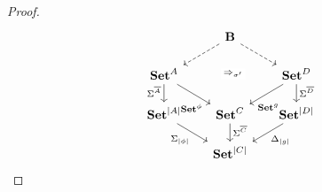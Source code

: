 \documentclass[11pt, oneside, article]{memoir}
\theoremstyle{plain}
\theoremstyle{definition}
\theoremstyle{remark}
\DeclarePairedDelimiter{\abs}{\lvert}{\rvert}
\newcommand{\namedcat}[1]{\mathbf{#1}}
\newcommand{\cat}[1]{\mathbf{#1}}
\newcommand{\Set}{\namedcat{Set}}
\newcommand{\CoalgOn}[2]{{#2}^{#1}}
\newcommand{\CoalgSet}[1]{\CoalgOn{#1}{\Set}}
\newcommand{\clift}[1]{\overline{#1}}
\newcommand{\pts}[1]{{\abs{#1}}}
\newcommand{\one}[1]{\pts{#1}}
\newcommand{\carr}{\Sigma}
\newcommand{\leindex}[1]{\Sigma_{#1}}
\newcommand{\reindex}[1]{\Delta_{#1}}
\newcommand{\car}[1]{\carr^{#1}}
\newcommand{\com}[2]{{#1}^{#2}}
\newcommand{\con}[2]{{#1}^{#2}}
\newcommand{\cmnd}[1]{{#1}}
\newcommand{\cA}{\cmnd{A}}
\newcommand{\cB}{\cmnd{B}}
\newcommand{\cC}{\cmnd{C}}
\newcommand{\cD}{\cmnd{D}}
\newcommand{\bB}{\cat{B}}
\newcommand{\ASet}{\CoalgSet{\cA}}
\newcommand{\BSet}{\CoalgSet{\cB}}
\newcommand{\CSet}{\CoalgSet{\cC}}
\newcommand{\DSet}{\CoalgSet{\cD}}
\newcommand{\SetpA}{\Set^\pts{\cA}}
\newcommand{\SetpB}{\Set^\pts{\cB}}
\newcommand{\SetpC}{\Set^\pts{\cC}}
\newcommand{\SetpD}{\Set^\pts{\cD}}
\begin{document}
\begin{proof}
\[\begin{tikzcd}[column sep=17, row sep=15]
      & \bB & \\
      \ASet && \DSet \\
      \SetpA & \CSet & \SetpD \\
      & \SetpC
      \arrow[dashed, from=1-2, to=2-1]
      \arrow[dashed, from=1-2, to=2-3]
      \arrow["{\Rightarrow_{\sigma'}}"{description}, shift left, draw=none, from=1-2, to=3-2]
      \arrow["\car{\clift{\cA}}"'{pos=0.4}, from=2-1, to=3-1]
      \arrow["{\com{\Set}{\phi}}"'{pos=0.85}, from=2-1, to=3-2]
      \arrow["{\con{\Set}{g}}"{pos=0.85}, from=2-3, to=3-2]
      \arrow["\car{\clift{\cD}}"{pos=0.4}, from=2-3, to=3-3]
      \arrow["{\leindex{\one{\phi}}}"', from=3-1, to=4-2]
      \arrow["\car{\clift{\cC}}"{pos=0.4}, from=3-2, to=4-2]
      \arrow["{\reindex{\one{g}}}", from=3-3, to=4-2]
    \end{tikzcd}
  \]

\end{proof}
\end{document}
